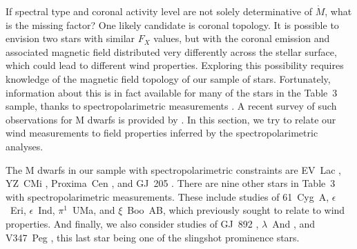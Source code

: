 \documentclass[preprint]{aastex}
\begin{document}
     If spectral type and coronal activity level are not solely
determinative of $\dot{M}$, what is the missing factor?  One likely
candidate is coronal topology.  It is possible to envision two
stars with similar $F_X$ values, but with the coronal emission
and associated magnetic field distributed very differently
across the stellar surface, which could lead to different
wind properties.  Exploring this possibility requires
knowledge of the magnetic field topology of our sample of stars.
Fortunately, information about this is in fact available for
many of the stars in the Table~3 sample, thanks to spectropolarimetric
measurements \citep{jm08b}.  A recent survey of such observations for
M dwarfs is provided by \citet{ok21}.  In this section, we try to relate
our wind measurements to field properties inferred by the
spectropolarimetric analyses.

     The M dwarfs in our sample with spectropolarimetric constraints
are EV~Lac \citep{jm08b}, YZ~CMi \citep{jm08b}, Proxima~Cen \citep{bk21},
and GJ~205 \citep{emh16}.  There are nine other stars in Table~3 with
spectropolarimetric measurements.  These include studies of
61~Cyg~A, $\epsilon$~Eri, $\epsilon$~Ind, $\pi^1$~UMa, and $\xi$~Boo~AB,
which \citet{aav16b} previously sought to relate to wind properties.
And finally, we also consider studies of GJ~892
\citep{cpf18}, $\lambda$~And \citep{dof21}, and
V347~Peg \citep{jm08a}, this last star being one of the slingshot
prominence stars.
\end{document}
